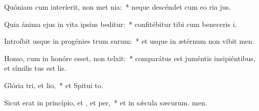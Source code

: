 \item Quóniam cum interíerit, non met nia:~* neque descéndet cum eo ria jus.
\item Quia ánima ejus in vita ipsíus beditur:~* confitébitur tibi cum beneceris i.
\item Introíbit usque in progénies trum surum:~* et usque in ætérnum non vibit men.
\item Homo, cum in honóre esset, non telxit:~* comparátus est juméntis insipiéntibus, et símilis tus est lis.
\item Glória tri, et lio,~* et Spitui to.
\item Sicut erat in princípio, et , et per,~* et in sǽcula sæcurum. men.
